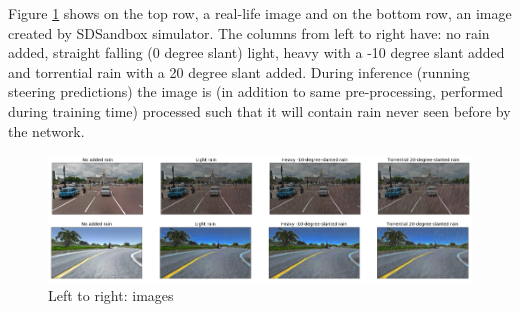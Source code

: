 Figure \ref{fig:AutomoldRoadAugmentationLibrary} shows on the top row, a real-life image and on the bottom row, an image created by SDSandbox simulator. The columns from left to right have: no rain added, straight falling (0 degree slant) light, heavy with a -10 degree slant added and torrential rain with a 20 degree slant added.  
During inference (running steering predictions) the image is (in addition to same pre-processing, performed during training time) processed such that it will contain rain never seen before by the network. 

\begin{figure}[h!]
\centering
\includegraphics[width=\textwidth]{Figures/AutomoldRain.png}
\caption{Left to right: images}
\label{fig:AutomoldRoadAugmentationLibrary}
\end{figure}


